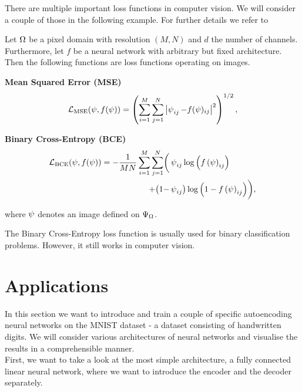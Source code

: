There are multiple important loss functions in computer vision. We will consider a couple of those in the following example. For further details we refer to \cite{foster2022generative}


\begin{example}
Let $\Omega$ be a pixel domain with resolution $(M,N)$ and $d$ the number of channels. Furthermore, let $f$ be a neural network with arbitrary but fixed architecture. Then the following functions are loss functions operating on images.
\begin{mydescription}{}
\item[\textbf{Mean Squared Error (MSE)}] \begin{align*}
\operatorname{\operatorname{\mathcal{L}}_\text{MSE}}(\operatorname{\psi}, f(\operatorname{\psi})) = \left(\sum_{i=1}^{M}\sum_{j=1}^{N}\left|\operatorname{\psi}_{ij} - f(\operatorname{\psi})_{ij}\right|^2\right)^{1/2},
\end{align*}
\item[\textbf{Binary Cross-Entropy (BCE)}]
\begin{align*}
\operatorname{\operatorname{\mathcal{L}}_\text{BCE}}(\operatorname{\psi}, f(\operatorname{\psi})) = - \frac{1}{MN}\sum_{i=1}^{M}\sum_{j=1}^{N} \biggl(&\operatorname{\psi}_{ij} \log\left(f\left(\operatorname{\psi}\right)_{ij}\right)\\ + \bigl(1-&\operatorname{\psi}_{ij}\bigr)\log\left(1 - f\left(\operatorname{\psi}\right)_{ij}\right)\biggr),
\end{align*}
\end{mydescription}
where $\operatorname{\psi}$ denotes an image defined on $\Psi_{\Omega}$.
\end{example}


\begin{remark}
The Binary Cross-Entropy loss function is usually used for binary classification problems. However, it still works in computer vision.
\end{remark}


\section{Applications}\label{sec:ae_applications}
In this section we want to introduce and train a couple of specific autoencoding neural networks on the MNIST dataset - a dataset consisting of handwritten digits. We will consider various architectures of neural networks and visualise the results in a comprehensible manner.\\
First, we want to take a look at the most simple architecture, a fully connected linear neural network, where we want to introduce the encoder and the decoder separately.

